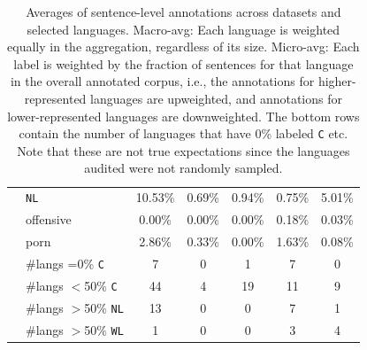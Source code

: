 \begin{table}[th]
{\begin{tabular}{llccccc}
                                                                  & \texttt{NL}                 & 10.53\%                               & 0.69\%                                   & 0.94\%              & 0.75\%         & 5.01\%       \\
                                                                  & offensive                   & 0.00\%                                & 0.00\%                                   & 0.00\%              & 0.18\%         & 0.03\%       \\
                                                                  & porn                        & 2.86\%                                & 0.33\%                                   & 0.00\%              & 1.63\%         & 0.08\%       \\
        \midrule
                                                                  & \#langs =0\% \texttt{C}     & 7                                     & 0                                        & 1                   & 7              & 0            \\
                                                                  & \#langs $<$50\% \texttt{C}  & 44                                    & 4                                        & 19                  & 11             & 9            \\
                                                                  & \#langs $>$50\% \texttt{NL} & 13                                    & 0                                        & 0                   & 7              & 1            \\
                                                                  & \#langs $>$50\% \texttt{WL} & 1                                     & 0                                        & 0                   & 3              & 4            \\
        \bottomrule
    \end{tabular}%
    }
    \caption{Averages of sentence-level annotations across datasets and selected languages. Macro-avg: Each language is weighted equally in the aggregation, regardless of its size. Micro-avg: Each label is weighted by the fraction of sentences for that language in the overall annotated corpus, i.e., the annotations for higher-represented languages are upweighted, and annotations for lower-represented languages are downweighted. The bottom rows contain the number of languages that have 0\% labeled \texttt{C} etc. Note that these are not true expectations since the languages audited were not randomly sampled. }
    \label{tab:results}
\end{table}





